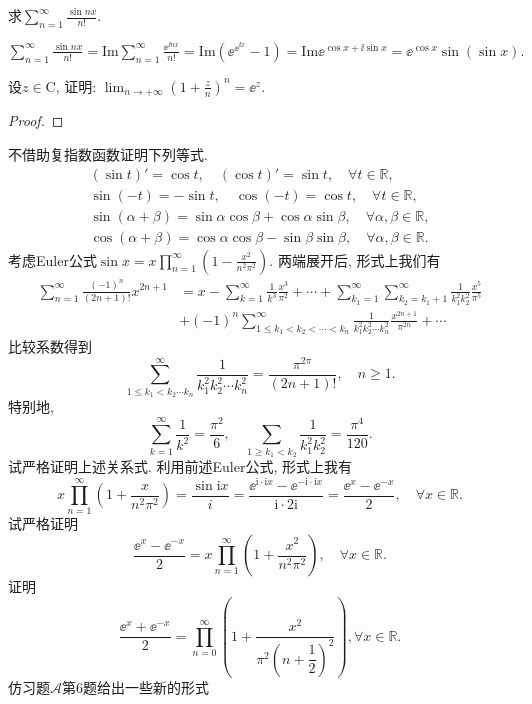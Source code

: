 \begin{quizb}
\woe 求\(\sum_{n=1}^{\infty}\frac{\sin nx}{n!}\).
\begin{solution}
\(\sum_{n=1}^{\infty}\frac{\sin nx}{n!}=\mathrm{Im}\sum_{n=1}^{\infty}\frac{\ee^{\ii nx}}{n!}=\mathrm{Im}\left(\ee^{\ee^{\ii x}}-1\right)=\mathrm{Im}\ee^{\cos x+\ii\sin x}=\ee^{\cos x}\sin\left(\sin x\right).\)
\end{solution}
\woe 设\(z\in\mathrm{C}\), 证明: \(\lim_{n\rightarrow+\infty}\left(1+\frac{z}{n}\right)^n=\ee^z\).
\begin{proof}

\end{proof}
\woe 不借助复指数函数证明下列等式.
\begin{gather*}
(\sin t)'=\cos t,\quad (\cos t)'=\sin t,\quad\forall t\in\mathbb{R},\\
\sin (-t)=-\sin t,\quad \cos(-t)=\cos t,\quad\forall t\in\mathbb{R},\\
\sin (\alpha+\beta)=\sin\alpha\cos\beta+\cos\alpha\sin\beta,\quad\forall\alpha,\beta\in\mathbb{R},\\
\cos(\alpha+\beta)=\cos\alpha\cos\beta-\sin\beta\sin\beta,\quad\forall\alpha,\beta\in\mathbb{R}.
\end{gather*}
\woe 考虑Euler公式\(\sin x=x\prod_{n=1}^{\infty}\left(1-\frac{x^2}{n^2\pi^2}\right)\). 两端展开后, 形式上我们有\[\begin{split}
    \sum_{n=1}^{\infty}\frac{(-1)^n}{(2n+1)!}x^{2n+1}&=x-\sum_{k=1}^{\infty}\frac{1}{k^3}\frac{x^3}{\pi^2}+\cdots+\sum_{k_1=1}^{\infty}\sum_{k_2=k_1+1}^{\infty}\frac{1}{k_1^2k_2^2}\frac{x^5}{\pi^5}\\&+(-1)^n\sum_{1\leqslant k_1<k_2<\cdots<k_n}^{\infty}\frac{1}{k_1^2k_2^2\cdots k_n^2}\frac{x^{2n+1}}{\pi^{2n}}+\cdots
\end{split}\]比较系数得到\[\sum_{1\leqslant k_1<k_2\cdots k_n}^{\infty}\frac{1}{k_1^2k_2^2\cdots k_n^2}=\frac{\pi^{2\pi}}{(2n+1)!},\quad n\geqslant 1.\]特别地,\[\sum_{k=1}^{\infty}\frac{1}{k^2}=\frac{\pi^2}{6},\quad\sum_{1\geqslant k_1<k_2}\frac{1}{k_1^2k_2^2}=\frac{\pi^4}{120}.\]试严格证明上述关系式.
利用前述Euler公式, 形式上我有\[x\prod_{n=1}^{\infty}\left(1+\frac{x}{n^2\pi^2}\right)=\frac{\sin\mathrm{i}x}{i}=\frac{\ee^{\mathrm{i}\cdot\mathrm{i}x}-\ee^{\mathrm{-i}\cdot\mathrm{i}x}}{\mathrm{i}\cdot 2\mathrm{i}}=\frac{\ee^x-\ee^{-x}}{2},\quad\forall x\in\mathbb{R}.\]试严格证明\[\frac{\ee^{x}-\ee^{-x}}{2}=x\prod_{n=1}^{\infty}\left(1+\frac{x^2}{n^2\pi^2}\right),\quad\forall x\in\mathbb{R}.\]
\woe 证明\[\frac{\ee^{x}+\ee^{-x}}{2}=\prod_{n=0}^{\infty}\left(1+\frac{x^2}{\pi^2\left(n+\dfrac{1}{2}\right)^2}\right),\forall x\in\mathbb{R}.\]
\woe 仿习题\(\boldsymbol{\mathcal{A}}\)第6题给出一些新的形式
\end{quizb}